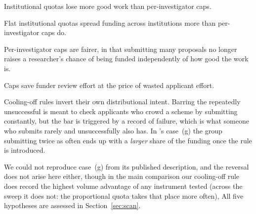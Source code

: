 \documentclass[11pt,a4paper]{article}
\begin{document}
\begin{description}\setlength\itemsep{0.1em}
\item[H1] Institutional quotas lose more good work than per-investigator caps.
\item[H2] Flat institutional quotas spread funding across institutions more than
      per-investigator caps do.
\item[H3] Per-investigator caps are fairer, in that submitting many proposals no
      longer raises a researcher's chance of being funded independently of how
      good the work is.
\item[H4] Caps save funder review effort at the price of wasted applicant effort.
\item[H5] Cooling-off rules invert their own distributional intent. Barring the
      repeatedly unsuccessful is meant to check applicants who crowd a scheme by
      submitting constantly, but the bar is triggered by a record of failure,
      which is what someone who submits rarely and unsuccessfully also has. In
      \citeauthor{roebber2011}'s case~(g) the group submitting twice as often
      ends up with a \emph{larger} share of the funding once the rule is
      introduced.
\end{description}

We could not reproduce case~(g) from its published description, and the reversal
does not arise here either, though in the main comparison our cooling-off rule does record the highest
volume advantage of any instrument tested (across the sweep it does not: the
proportional quota takes that place more often), %
All five hypotheses are assessed in Section~\ref{sec:scan}.
\end{document}
